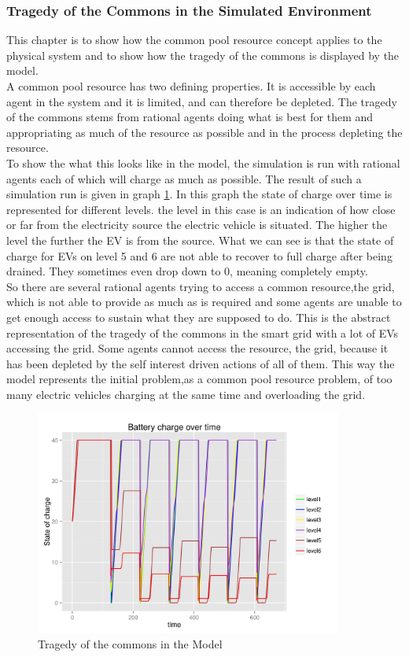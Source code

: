\documentclass[a4paper]{article}
\begin{document}
\subsubsection{Tragedy of the Commons in the Simulated Environment}
This chapter is to show how the common pool resource concept applies to the physical system and to show how 
the tragedy of the commons is displayed by the model. \\
A common pool resource has two defining properties. It is accessible by each agent in the system and it is limited, and can 
therefore be depleted. The tragedy of the commons stems from rational agents doing what is best for them and 
appropriating as much of the resource as possible and in the process depleting the resource. \\
To show the what this looks like in the model, the simulation is run with rational agents each of which will charge 
as much as possible.
The result of such a simulation run is given in graph \ref{software_tragedy}. In this graph the state of charge over 
time is 
represented for different levels. the level in this case is an indication of how close or far from the 
electricity source the electric vehicle is situated. The higher the level the further the EV is from the source. 
What we can see is that the state of charge for EVs on level 5 and 6 are not able to recover to full charge after being 
drained. They sometimes even drop down to 0, meaning completely empty.\\
So there are several rational agents trying to access a common resource,the grid, which is not able to provide as much 
as is required and some agents are unable to get enough access to sustain what they are supposed to do.
This is the abstract 
representation of the tragedy of the commons in the smart grid with a lot of EVs accessing the grid. Some agents 
cannot access the resource, the grid, because it has been depleted by the self interest driven actions of 
all of them. This way the model represents the initial problem,as a common pool resource problem, 
of too many electric vehicles charging at the same time and overloading the grid. 


\begin{figure}[!ht]
 \centering
 \includegraphics[width = 0.9\textwidth]{tragedy_of_commons.jpg}
 \caption{Tragedy of the commons in the Model}
 \label{software_tragedy}
\end{figure}
\end{document}
